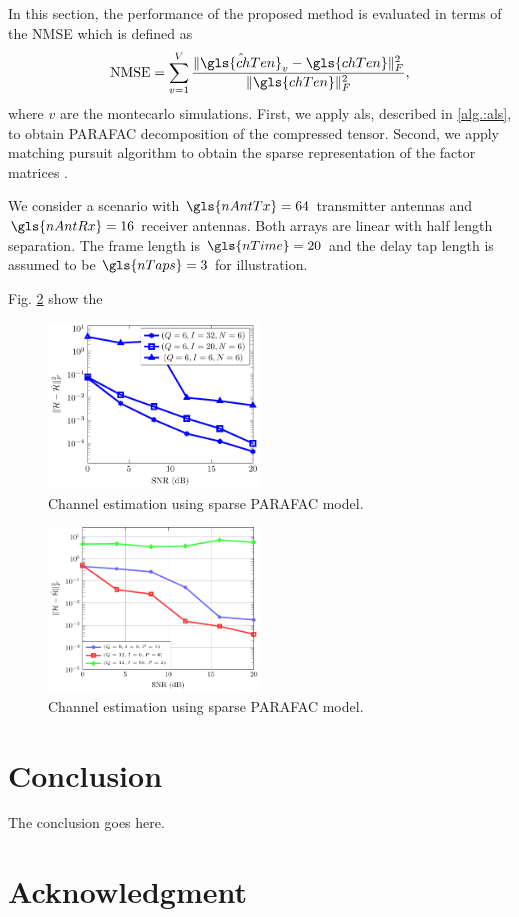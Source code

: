 \documentclass[conference]{IEEEtran}
\begin{document}
In this section, the performance of the proposed method is
evaluated in terms of the \gls{NMSE} which is defined as 
\begin{equation}
  \label{eq:nmse}
  \textrm{NMSE} = \sum^{V}_{v=1} \frac{\|\hat{\gls{chTen}}_v - \gls{chTen} \|^{2}_F}{\|\gls{chTen} \|^{2}_F},
\end{equation}
where $v$ are the montecarlo simulations.
First, we apply \gls{als}, described in
\ref{alg.:als}, to obtain \gls{PARAFAC} decomposition of the compressed tensor.
Second, we apply matching pursuit algorithm to obtain the sparse representation
of the factor matrices \cite{Tropp:2008}.

We consider a scenario with  $\gls{nAntTx}=64$ transmitter antennas and
$\gls{nAntRx}=16$ receiver antennas. Both arrays are linear with half length
separation. The frame length is $\gls{nTime} = 20$ and the delay tap length is
assumed to be $\gls{nTaps}=3$ for illustration.

Fig. \ref{fig:tx_beams}  show the 


\begin{figure}[!thb]
  \centering
  \includegraphics[width=0.5\textwidth]{fig/snr_nmse}
  \caption{Channel estimation using sparse PARAFAC model. }
  \label{fig:tx_beams}
\end{figure}

\begin{figure}[!thb]
  \centering
  \includegraphics[width=0.5\textwidth]{fig/snr_nmse_rx}
  \caption{Channel estimation using sparse PARAFAC model. }
  \label{fig:tx_beams}
\end{figure}

\section{Conclusion}
The conclusion goes here.

\section*{Acknowledgment}



\end{document}
